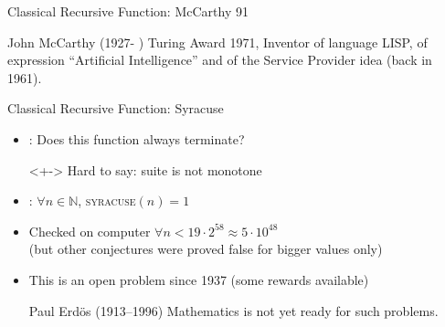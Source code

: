 \begin{Coupe}
\begin{frame}{Classical Recursive Function: McCarthy 91}
\begin{block}
\begin{itemize}
    \end{itemize}
    
  \end{block}

  \begin{block}{John McCarthy (1927- )}
    Turing Award 1971, Inventor of language LISP, of expression ``Artificial
    Intelligence'' and of the Service Provider idea (back in 1961).
  \end{block}
\end{frame}
\begin{frame}{Classical Recursive Function: Syracuse} \label{syracuse}

  \centerline{}

  \bigskip

  \begin{itemize}
  \item {}: Does this function always terminate?
  \item[]<+-> Hard to say: suite is not monotone
  \item<+-> :
    $\forall n\in\mathbb{N}$, \textsc{syracuse}$(n)=1$
  \item<+-> Checked on computer $\forall n<19\cdot2^{58}\approx5\cdot10^{48}$\\
    {\small(but other conjectures were proved false for bigger values only)}
  \item<+-> This is an open problem since 1937 (some rewards available)
    \begin{boitequote}{Paul Erd\"{o}s (1913--1996)}
      Mathematics is not yet ready for such problems.
    \end{boitequote}
  \end{itemize}

\end{frame}

\end{Coupe}

